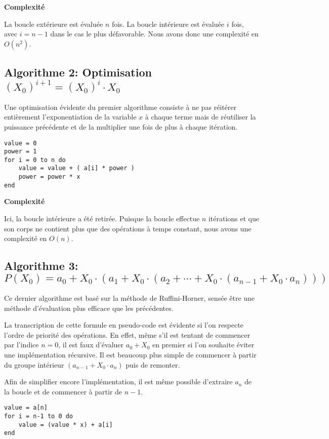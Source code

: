 \documentclass[11pt,a4paper]{article}
\begin{document}
\textbf{Complexité}

La boucle extérieure est évaluée $n$ fois. La boucle intérieure est évaluée $i$ fois, avec $i = n-1$ dans le cas le plus défavorable. Nous avons donc une complexité en $O(n^{2})$.

\subsection{Algorithme 2: Optimisation $ (X_{0})^{i+1} = (X_{0})^{i} \cdot X_{0} $}

Une optimisation évidente du premier algorithme consiste à ne pas réitérer entièrement l'exponentiation de la variable $x$ à chaque terme mais de réutiliser la puissance précédente et de la multiplier une fois de plus à chaque itération.

\vspace{1em} \begin{lstlisting}
value = 0
power = 1
for i = 0 to n do
	value = value + ( a[i] * power )
	power = power * x
end
\end{lstlisting}

\textbf{Complexité}

Ici, la boucle intérieure a été retirée. Puisque la boucle effectue $n$ itérations et que son corps ne contient plus que des opérations à temps constant, nous avons une complexité en $O(n)$.

\subsection{Algorithme 3: $ P(X_{0}) = a_{0} + X_{0} \cdot (a_{1} + X_{0} \cdot (a_{2} + \cdots + X_{0} \cdot (a_{n-1} + X_{0} \cdot a_{n}))) $}

Ce dernier algorithme est basé sur la méthode de Ruffini-Horner, sensée être une méthode d'évaluation plus efficace que les précédentes.

La transcription de cette formule en pseudo-code est évidente si l'on respecte l'ordre de priorité des opérations. En effet, même s'il est tentant de commencer par l'indice $n = 0$, il est faux d'évaluer $a_{0} + X_{0}$ en premier si l'on souhaite éviter une implémentation récursive. Il est beaucoup plus simple de commencer à partir du groupe intérieur $(a_{n-1} + X_{0} \cdot a_{n})$ puis de remonter. 

Afin de simplifier encore l'implémentation, il est même possible d'extraire $a_{n}$ de la boucle et de commencer à partir de $n-1$.

\vspace{1em} \begin{lstlisting}
value = a[n]
for i = n-1 to 0 do
	value = (value * x) + a[i]
end
\end{lstlisting}
\end{document}
